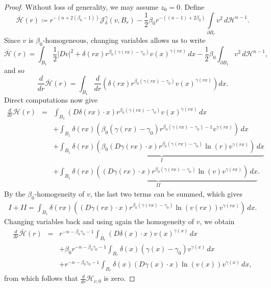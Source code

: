 \documentclass[reqno,11pt]{amsart}
\newcommand{\1}{\mathds{1}}
\numberwithin{equation}{section}
\begin{document}
\begin{proof}
Without loss of generality, we may assume $z_0 = 0$. Define
$$
  \overline{\mathcal{H}}(r) \coloneqq   r^{-(n + 2(\beta_0-1))}\mathcal{J}_\delta^\gamma(v,B_r) - \frac{1}{2}\beta_0 r^{-((n-1) + 2\beta_0)}\int\limits_{\partial B_r}v^2\, d\mathcal{H}^{n-1}.
$$
Since $v$ is $\beta_0$-homogeneous, changing variables allows us to write
$$
	\overline{\mathcal{H}}(r) = \int_{B_1} \frac{1}{2}|Dv|^2 + \delta(rx)r^{\beta_0(\gamma(rx)-\gamma_0)}v(x)^{\gamma(rx)}\,dx -\frac{1}{2}\beta_0 \int_{\partial B_1}v^2\,d\mathcal{H}^{n-1},
$$
and so
$$
	\frac{d}{dr}\overline{\mathcal{H}}(r) = \int_{B_1} \frac{d}{dr}\left(\delta(rx)r^{\beta_0(\gamma(rx)-\gamma_0)}v(x)^{\gamma(rx)} \right)dx.
$$
Direct computations now give
\begin{eqnarray*}
	\frac{d}{dr}\overline{\mathcal{H}}(r) & = & \int_{B_1} \left(D\delta(rx)\cdot x \right)r^{\beta_0(\gamma(rx)-\gamma_0)}v(x)^{\gamma(rx)}\,dx\\
	& & + \int_{B_1}\delta(rx)\left(\beta_0(\gamma(rx)-\gamma_0)r^{\beta_0(\gamma(rx)-\gamma_0)-1}v^{\gamma(rx)} \right)\,dx\\
	& & + \underbrace{\int_{B_1}\delta(rx)\left(\beta_0(D\gamma(rx) \cdot x)r^{\beta_0(\gamma(rx)-\gamma_0)}\ln(r)v^{\gamma(rx)} \right)\,dx}_{I}\\
	& & + \underbrace{\int_{B_1}\delta(rx)\left((D\gamma(rx) \cdot x)r^{\beta_0(\gamma(rx)-\gamma_0)}\ln(v)v^{\gamma(rx)} \right)\,dx}_{II}.
\end{eqnarray*}
By the $\beta_0$-homogeneity of $v$, the last two terms can be summed, which gives
\begin{eqnarray*}
	I + II =  \int_{B_1}\delta(rx)\left((D\gamma(rx) \cdot x)r^{\beta_0(\gamma(rx)-\gamma_0)}\ln(v(rx))v^{\gamma(rx)} \right)\,dx.
\end{eqnarray*}
Changing variables back and using again the homogeneity of $v$, we obtain
\begin{eqnarray*}
	\frac{d}{dr}\overline{\mathcal{H}}(r) & = & r^{-n-\beta_0 \gamma_0-1}\int_{B_r} \left(D\delta(x)\cdot x \right)v(x)^{\gamma(x)}\,dx\\
	& & + \beta_0r^{-n-\beta_0\gamma_0-1}\int_{B_r}\delta(x)(\gamma(x)-\gamma_0)v^{\gamma(x)}\,dx\\
	& & + r^{-n-\beta_0\gamma_0-1}\int_{B_r}\delta(x)\left(D\gamma(x) \cdot x\right)\ln(v(x))v^{\gamma(x)}\,dx,
\end{eqnarray*}
from which follows that $\frac{d}{dr}\mathcal{H}_{v,0}$ is zero.
\end{proof}
\end{document}
